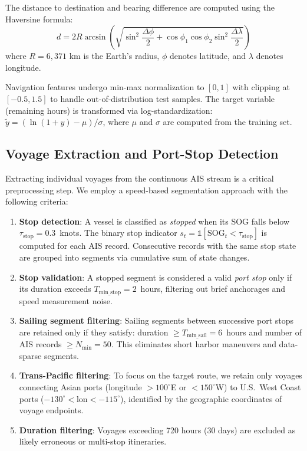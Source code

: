 \documentclass[conference]{IEEEtran}
\begin{document}
The distance to destination and bearing difference are computed using the Haversine formula:
\begin{equation}
    d = 2R \arcsin\!\left(\sqrt{\sin^2\!\frac{\Delta\phi}{2} + \cos\phi_1 \cos\phi_2 \sin^2\!\frac{\Delta\lambda}{2}}\right)
    \label{eq:haversine}
\end{equation}
where $R = 6{,}371$ km is the Earth's radius, $\phi$ denotes latitude, and $\lambda$ denotes longitude.

Navigation features undergo min-max normalization to $[0, 1]$ with clipping at $[-0.5, 1.5]$ to handle out-of-distribution test samples.
The target variable (remaining hours) is transformed via log-standardization: $\tilde{y} = (\ln(1+y) - \mu) / \sigma$, where $\mu$ and $\sigma$ are computed from the training set.

\subsection{Voyage Extraction and Port-Stop Detection}
\label{sec:voyage_extraction}

Extracting individual voyages from the continuous AIS stream is a critical preprocessing step.
We employ a speed-based segmentation approach with the following criteria:

\begin{enumerate}
    \item \textbf{Stop detection}: A vessel is classified as \textit{stopped} when its SOG falls below $\tau_{\text{stop}} = 0.3$~knots. The binary stop indicator $s_t = \mathbb{1}[\text{SOG}_t < \tau_{\text{stop}}]$ is computed for each AIS record. Consecutive records with the same stop state are grouped into segments via cumulative sum of state changes.
    \item \textbf{Stop validation}: A stopped segment is considered a valid \textit{port stop} only if its duration exceeds $T_{\text{min\_stop}} = 2$~hours, filtering out brief anchorages and speed measurement noise.
    \item \textbf{Sailing segment filtering}: Sailing segments between successive port stops are retained only if they satisfy: duration $\geq T_{\text{min\_sail}} = 6$~hours and number of AIS records $\geq N_{\text{min}} = 50$. This eliminates short harbor maneuvers and data-sparse segments.
    \item \textbf{Trans-Pacific filtering}: To focus on the target route, we retain only voyages connecting Asian ports (longitude $> 100^\circ$E or $< 150^\circ$W) to U.S.\ West Coast ports ($-130^\circ < \text{lon} < -115^\circ$), identified by the geographic coordinates of voyage endpoints.
    \item \textbf{Duration filtering}: Voyages exceeding 720 hours (30 days) are excluded as likely erroneous or multi-stop itineraries.
\end{enumerate}
\end{document}
